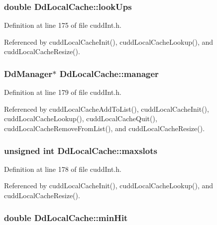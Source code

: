 \subsubsection{\setlength{\rightskip}{0pt plus 5cm}double \bf{Dd\-Local\-Cache::look\-Ups}}\label{structDdLocalCache_8ead01c431438c3c6efd103adaeba0b8}




Definition at line 175 of file cudd\-Int.h.

Referenced by cudd\-Local\-Cache\-Init(), cudd\-Local\-Cache\-Lookup(), and cudd\-Local\-Cache\-Resize().
\subsubsection{\setlength{\rightskip}{0pt plus 5cm}\bf{Dd\-Manager}$\ast$ \bf{Dd\-Local\-Cache::manager}}\label{structDdLocalCache_2b8e464cc6f5b614d788f019b9e5f6f1}




Definition at line 179 of file cudd\-Int.h.

Referenced by cudd\-Local\-Cache\-Add\-To\-List(), cudd\-Local\-Cache\-Init(), cudd\-Local\-Cache\-Lookup(), cudd\-Local\-Cache\-Quit(), cudd\-Local\-Cache\-Remove\-From\-List(), and cudd\-Local\-Cache\-Resize().
\subsubsection{\setlength{\rightskip}{0pt plus 5cm}unsigned int \bf{Dd\-Local\-Cache::maxslots}}\label{structDdLocalCache_f4379636b29a9bfe4a55708ac637545a}




Definition at line 178 of file cudd\-Int.h.

Referenced by cudd\-Local\-Cache\-Init(), cudd\-Local\-Cache\-Lookup(), and cudd\-Local\-Cache\-Resize().
\subsubsection{\setlength{\rightskip}{0pt plus 5cm}double \bf{Dd\-Local\-Cache::min\-Hit}}\label{structDdLocalCache_0de25f5b28a2b0d37be72e53fac4ae56}




